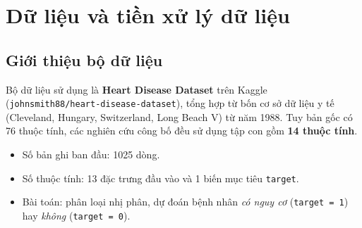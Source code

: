 %   

\chapter{Dữ liệu và tiền xử lý dữ liệu}
\label{chap:data}

\section{Giới thiệu bộ dữ liệu}
Bộ dữ liệu sử dụng là \textbf{Heart Disease Dataset} trên Kaggle
(\texttt{johnsmith88/heart-disease-dataset}), tổng hợp từ bốn cơ sở dữ liệu y tế
(Cleveland, Hungary, Switzerland, Long Beach V) từ năm 1988. Tuy bản gốc có 76
thuộc tính, các nghiên cứu công bố đều sử dụng tập con gồm \textbf{14 thuộc tính}.

\begin{itemize}
  \item Số bản ghi ban đầu: 1025 dòng.
  \item Số thuộc tính: 13 đặc trưng đầu vào và 1 biến mục tiêu \texttt{target}.
  \item Bài toán: phân loại nhị phân, dự đoán bệnh nhân \emph{có nguy cơ}
        (\texttt{target = 1}) hay \emph{không} (\texttt{target = 0}).
\end{itemize}

